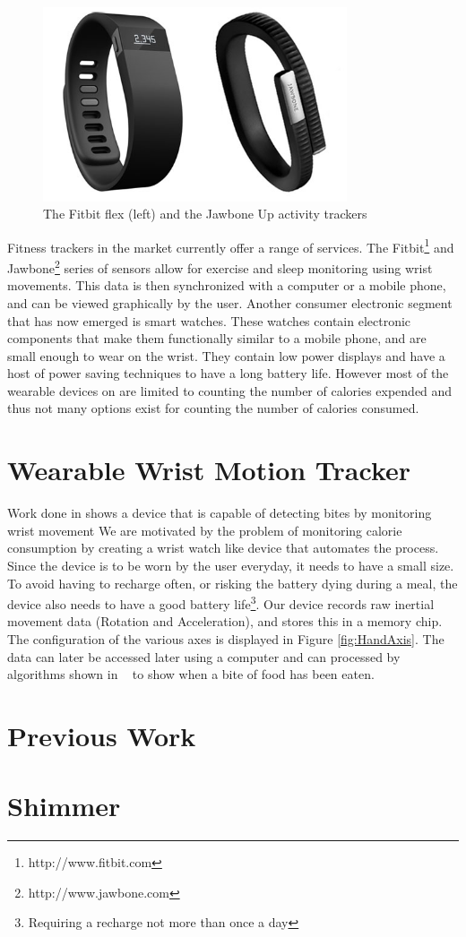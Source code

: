 \begin{figure}
\begin{center}
\includegraphics[width=0.8\textwidth]{images/JawFit.png}
\caption{The Fitbit flex (left) and the Jawbone Up activity trackers}
\label{fig:FitbitJawbone}

\end{center}
\end{figure}
Fitness trackers in the market currently offer a range of services. The Fitbit\footnote{http://www.fitbit.com} and Jawbone\footnote{http://www.jawbone.com} series of sensors allow for exercise and sleep monitoring using wrist movements. This data is then synchronized with a computer or a mobile phone, and can be viewed graphically by the user. Another consumer electronic segment that has now emerged is smart watches. These watches contain electronic components that make them functionally similar to a mobile phone, and are small enough to wear on the wrist. They contain low power displays and have a host of power saving techniques to have a long battery life. However most of the wearable devices on are limited to counting the number of calories expended and thus not many options exist for counting the number of calories consumed.
\section{Wearable Wrist Motion Tracker}
\label{Sec:WearbleTracker}
Work done in \cite{drennan2010assessment} shows a device that is capable of detecting bites by monitoring wrist movement
We are motivated by the problem of monitoring calorie consumption by creating a wrist watch like device that automates the process. Since the device is to be worn by the user everyday, it needs to have a small size. To avoid having to recharge often, or risking the battery dying during a meal, the device also needs to have a good battery life\footnote{Requiring a recharge not more than once a day}. Our device records raw inertial movement data (Rotation and Acceleration), and stores this in a memory chip. The configuration of the various axes is displayed in Figure \ref{fig:HandAxis}.
The data can later be accessed later using a computer and can processed by algorithms shown in ~\cite{dong2012new} to show when a bite of food has been eaten.

\section{Previous Work}

\section{Shimmer}